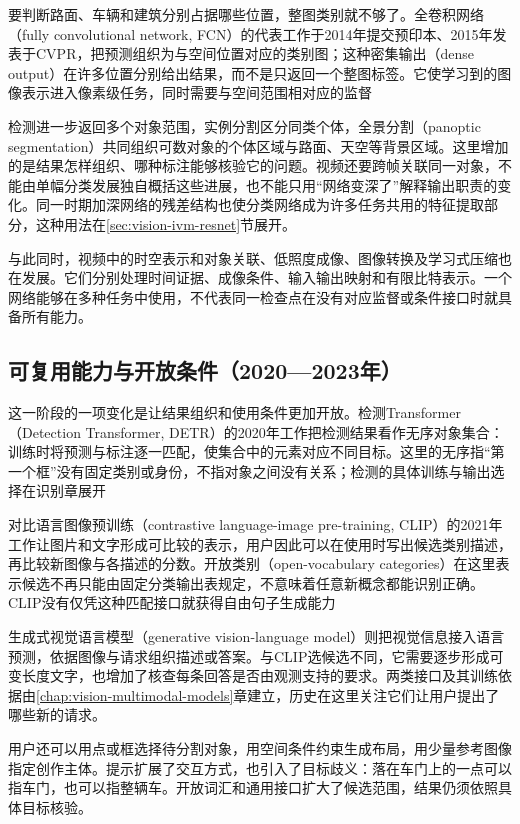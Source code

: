 要判断路面、车辆和建筑分别占据哪些位置，整图类别就不够了。全卷积网络（fully convolutional network, FCN）的代表工作于2014年提交预印本、2015年发表于CVPR，把预测组织为与空间位置对应的类别图；这种密集输出（dense output）在许多位置分别给出结果，而不是只返回一个整图标签。它使学习到的图像表示进入像素级任务，同时需要与空间范围相对应的监督

检测进一步返回多个对象范围，实例分割区分同类个体，全景分割（panoptic segmentation）共同组织可数对象的个体区域与路面、天空等背景区域。这里增加的是结果怎样组织、哪种标注能够核验它的问题。视频还要跨帧关联同一对象，不能由单幅分类发展独自概括这些进展，也不能只用“网络变深了”解释输出职责的变化。同一时期加深网络的残差结构也使分类网络成为许多任务共用的特征提取部分，这种用法在\ref{sec:vision-ivm-resnet}节展开。

与此同时，视频中的时空表示和对象关联、低照度成像、图像转换及学习式压缩也在发展。它们分别处理时间证据、成像条件、输入输出映射和有限比特表示。一个网络能够在多种任务中使用，不代表同一检查点在没有对应监督或条件接口时就具备所有能力。

\subsection{可复用能力与开放条件（2020—2023年）}
\label{sec:vision-overview-open-history}

这一阶段的一项变化是让结果组织和使用条件更加开放。检测Transformer（Detection Transformer, DETR）的2020年工作把检测结果看作无序对象集合：训练时将预测与标注逐一匹配，使集合中的元素对应不同目标。这里的无序指“第一个框”没有固定类别或身份，不指对象之间没有关系；检测的具体训练与输出选择在识别章展开

对比语言图像预训练（contrastive language-image pre-training, CLIP）的2021年工作让图片和文字形成可比较的表示，用户因此可以在使用时写出候选类别描述，再比较新图像与各描述的分数。开放类别（open-vocabulary categories）在这里表示候选不再只能由固定分类输出表规定，不意味着任意新概念都能识别正确。CLIP没有仅凭这种匹配接口就获得自由句子生成能力

生成式视觉语言模型（generative vision-language model）则把视觉信息接入语言预测，依据图像与请求组织描述或答案。与CLIP选候选不同，它需要逐步形成可变长度文字，也增加了核查每条回答是否由观测支持的要求。两类接口及其训练依据由\ref{chap:vision-multimodal-models}章建立，历史在这里关注它们让用户提出了哪些新的请求。

用户还可以用点或框选择待分割对象，用空间条件约束生成布局，用少量参考图像指定创作主体。提示扩展了交互方式，也引入了目标歧义：落在车门上的一点可以指车门，也可以指整辆车。开放词汇和通用接口扩大了候选范围，结果仍须依照具体目标核验。

